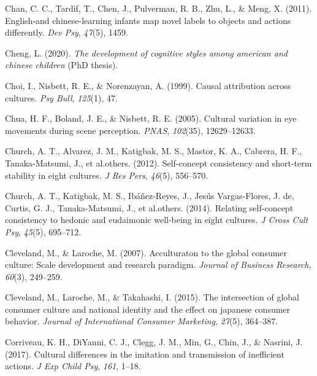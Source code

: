 \documentclass[
  man,floatsintext]{apa6}
\newlength{\cslhangindent}
\newlength{\cslentryspacingunit} %
\newenvironment{CSLReferences}[2] %
 {%
  \setlength{\parindent}{0pt}
  \ifodd #1
  \let\oldpar\par
  \def\par{\hangindent=\cslhangindent\oldpar}
  \fi
  \setlength{\parskip}{#2\cslentryspacingunit}
 }%
 {}
\begin{document}
\begin{CSLReferences}{1}{0}
\leavevmode{}%
Chan, C. C., Tardif, T., Chen, J., Pulverman, R. B., Zhu, L., \& Meng, X. (2011). English-and chinese-learning infants map novel labels to objects and actions differently. \emph{Dev Psy}, \emph{47}(5), 1459.

\leavevmode{}%
Cheng, L. (2020). \emph{The development of cognitive styles among american and chinese children} (PhD thesis).

\leavevmode{}%
Choi, I., Nisbett, R. E., \& Norenzayan, A. (1999). Causal attribution across cultures. \emph{Psy Bull}, \emph{125}(1), 47.

\leavevmode{}%
Chua, H. F., Boland, J. E., \& Nisbett, R. E. (2005). Cultural variation in eye movements during scene perception. \emph{PNAS}, \emph{102}(35), 12629--12633.

\leavevmode{}%
Church, A. T., Alvarez, J. M., Katigbak, M. S., Mastor, K. A., Cabrera, H. F., Tanaka-Matsumi, J., et al.others. (2012). Self-concept consistency and short-term stability in eight cultures. \emph{J Res Pers}, \emph{46}(5), 556--570.

\leavevmode{}%
Church, A. T., Katigbak, M. S., Ibáñez-Reyes, J., Jesús Vargas-Flores, J. de, Curtis, G. J., Tanaka-Matsumi, J., et al.others. (2014). Relating self-concept consistency to hedonic and eudaimonic well-being in eight cultures. \emph{J Cross Cult Psy}, \emph{45}(5), 695--712.

\leavevmode{}%
Cleveland, M., \& Laroche, M. (2007). Acculturaton to the global consumer culture: Scale development and research paradigm. \emph{Journal of Business Research}, \emph{60}(3), 249--259.

\leavevmode{}%
Cleveland, M., Laroche, M., \& Takahashi, I. (2015). The intersection of global consumer culture and national identity and the effect on japanese consumer behavior. \emph{Journal of International Consumer Marketing}, \emph{27}(5), 364--387.

\leavevmode{}%
Corriveau, K. H., DiYanni, C. J., Clegg, J. M., Min, G., Chin, J., \& Nasrini, J. (2017). Cultural differences in the imitation and transmission of inefficient actions. \emph{J Exp Child Psy}, \emph{161}, 1--18.


\end{CSLReferences}
\end{document}
